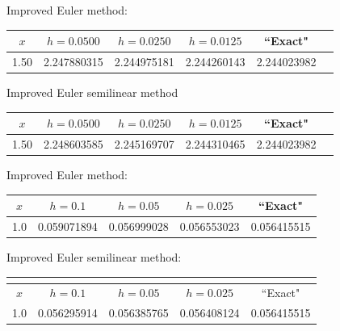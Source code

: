 \bigskip

{\small Improved Euler method:
\begin{tabular}{|c|r|r|r|r|r|}
\hline
\multicolumn{1}{|c|}{$x$}&
\multicolumn{1}{|c|}{$h=0.0500$}&
\multicolumn{1}{|c|}{$h=0.0250$}&
\multicolumn{1}{|c|}{$h=0.0125$}&
\multicolumn{1}{|c|}{``Exact"}\\ \hline
1.50 & 2.247880315 & 2.244975181 & 2.244260143 & 2.244023982 \\
\hline
\end{tabular}}

\bigskip

\hspace{.75in}
{\small Improved Euler semilinear method
\begin{tabular}{|c|r|r|r|r|r|}
\hline
\multicolumn{1}{|c|}{$x$}&
\multicolumn{1}{|c|}{$h=0.0500$}&
\multicolumn{1}{|c|}{$h=0.0250$}&
\multicolumn{1}{|c|}{$h=0.0125$}&
\multicolumn{1}{|c|}{``Exact"}\\ \hline
1.50 & 2.248603585 & 2.245169707 & 2.244310465 & 2.244023982 \\
\hline
\end{tabular}}

\bigskip

{\small Improved Euler method:
\begin{tabular}{|c|r|r|r|r|}
\hline
\multicolumn{1}{|c|}{$x$}&
\multicolumn{1}{|c|}{$h=0.1$}&
\multicolumn{1}{|c|}{$h=0.05$}&
\multicolumn{1}{|c|}{$h=0.025$}&
\multicolumn{1}{|c|}{``Exact"}\\ \hline
1.0 & 0.059071894 & 0.056999028 & 0.056553023 & 0.056415515 \\
\hline
\end{tabular}}
\medskip

\bigskip

\hspace{.75in}
{\small Improved Euler semilinear method:
\begin{tabular}{|c|r|r|r|r|}
\hline
\multicolumn{5}{|c|}{}\\\hline
\multicolumn{1}{|c|}{$x$}&
\multicolumn{1}{|c|}{$h=0.1$}&
\multicolumn{1}{|c|}{$h=0.05$}&
\multicolumn{1}{|c|}{$h=0.025$}&
\multicolumn{1}{|c|}{``Exact"}\\ \hline
1.0 & 0.056295914 & 0.056385765 & 0.056408124 & 0.056415515 \\
\hline
\end{tabular}}

